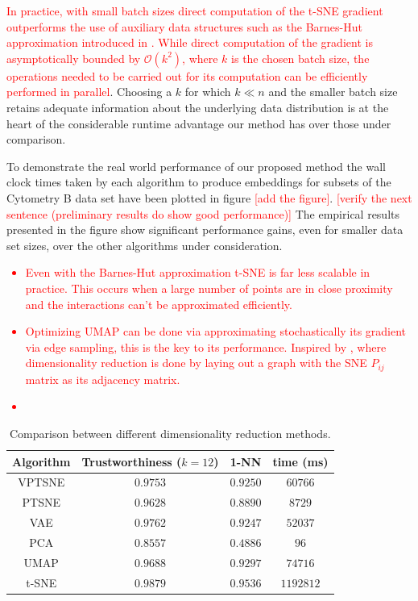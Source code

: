 \textcolor{red}{In practice, with small batch sizes direct computation of the t-SNE gradient outperforms the use of auxiliary data structures such as the Barnes-Hut approximation introduced in \citep{accelerated_tsne_2}. While direct computation of the gradient is asymptotically bounded by $\mathcal{O}(k^2)$, where $k$ is the chosen batch size, the operations needed to be carried out for its computation can be efficiently performed in parallel}. Choosing a $k$ for which $k \ll n$ and the smaller batch size retains adequate information about the underlying data distribution is at the heart of the considerable runtime advantage our method has over those under comparison.

To demonstrate the real world performance of our proposed method the wall clock times taken by each algorithm to produce embeddings for subsets of the Cytometry B data set have been plotted in figure \textcolor{red}{[add the figure]}. \textcolor{red}{[verify the next sentence (preliminary results do show good performance)]} The empirical results presented in the figure show significant performance gains, even for smaller data set sizes, over the other algorithms under consideration.

\textcolor{red}{
\begin{itemize}
\item Even with the Barnes-Hut approximation t-SNE is far less scalable in practice. This occurs when a large number of points are in close proximity and the interactions can't be approximated efficiently.
\item Optimizing UMAP can be done via approximating stochastically its gradient via edge sampling, this is the key to its performance. Inspired by \citep{largevis}, where dimensionality reduction is done by laying out a graph with the SNE $P_{ij}$ matrix as its adjacency matrix.
\item 
\end{itemize}
}

\begin{table}[]
\centering
\caption{Comparison between different dimensionality reduction methods.}
\label{table:comparison}
\begin{tabular}{cccc}
Algorithm   & Trustworthiness ($k=12$)   & 1-NN     & time (ms) \\ \hline \hline
VPTSNE      & $0.9753$                   & $0.9250$ & $60766$   \\ \hline
PTSNE       & $0.9628$                   & $0.8890$ & $8729$    \\ \hline
VAE         & $0.9762$                   & $0.9247$ & $52037$   \\ \hline
PCA         & $0.8557$                   & $0.4886$ & $96$      \\ \hline
UMAP        & $0.9688$                   & $0.9297$ & $74716$   \\ \hline
t-SNE       & $0.9879$                   & $0.9536$ & $1192812$ \\ \hline
\end{tabular}
\end{table}

